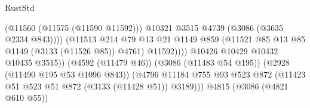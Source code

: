 \begin{lexlean}{RustStd}
\begin{coremodule}
                                                          (@11560 (@11575 (@11590 @11592)))
                                                          @10321
                                                          @3515
                                                          @4739
                                                          (@3086 (@3635 @2334 @843))))
                                                      (@11513
                                                        @214
                                                        @79
                                                        @13
                                                        @21
                                                        @1149
                                                        @859
                                                        (@11521
                                                          @85
                                                          @13
                                                          @85
                                                          @1149
                                                          (@3133 (@11526 @85))
                                                          @4761)
                                                        @11592))))
                                                @10426
                                                @10429
                                                @10432
                                                @10435
                                                @3515))
                                            (@4592 (@11479 @46))
                                            (@3086 (@11483 @54 @195))
                                            (@2928 (@11490 @195 @53 @1096 @843))
                                            (@4796
                                              @11184
                                              @755
                                              @93
                                              @523
                                              @872
                                              (@11423
                                                @51
                                                @523
                                                @51
                                                @872
                                                (@3133 (@11428 @51))
                                                @3189)))
                                          @4815
                                          (@3086 (@4821 @610 @55))

\end{coremodule}
\end{lexlean}
